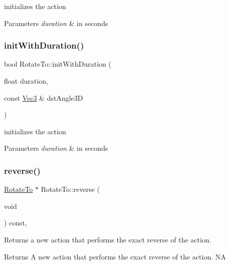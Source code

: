 initializes the action 
\begin{DoxyParams}{Parameters}
{\em duration} & in seconds \\
\hline
\end{DoxyParams}
\mbox{\label{classRotateTo_a905c81a24bdfa502fd0cdeb86b75f037}} 
\subsubsection{\texorpdfstring{init\+With\+Duration()}{initWithDuration()}\hspace{0.1cm}{\footnotesize\ttfamily [4/4]}}
{\footnotesize\ttfamily bool Rotate\+To\+::init\+With\+Duration (\begin{DoxyParamCaption}\item[{float}]{duration,  }\item[{const \hyperlink{classVec3}{Vec3} \&}]{dst\+Angle3D }\end{DoxyParamCaption})}

initializes the action 
\begin{DoxyParams}{Parameters}
{\em duration} & in seconds \\
\hline
\end{DoxyParams}
\mbox{\label{classRotateTo_aa33593a0fb9f174ed68ebcf15432a005}} 
\subsubsection{\texorpdfstring{reverse()}{reverse()}\hspace{0.1cm}{\footnotesize\ttfamily [1/2]}}
{\footnotesize\ttfamily \hyperlink{classRotateTo}{Rotate\+To} $\ast$ Rotate\+To\+::reverse (\begin{DoxyParamCaption}\item[{void}]{ }\end{DoxyParamCaption}) const\hspace{0.3cm}{\ttfamily [override]}, {\ttfamily [virtual]}}

Returns a new action that performs the exact reverse of the action.

\begin{DoxyReturn}{Returns}
A new action that performs the exact reverse of the action.  NA 
\end{DoxyReturn}


